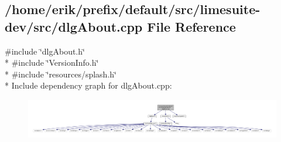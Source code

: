 \subsection{/home/erik/prefix/default/src/limesuite-\/dev/src/dlg\+About.cpp File Reference}
\label{dlgAbout_8cpp}
{\ttfamily \#include \char`\"{}dlg\+About.\+h\char`\"{}}\\*
{\ttfamily \#include \char`\"{}Version\+Info.\+h\char`\"{}}\\*
{\ttfamily \#include \char`\"{}resources/splash.\+h\char`\"{}}\\*
Include dependency graph for dlg\+About.\+cpp\+:
\nopagebreak
\begin{figure}[H]
\begin{center}
\leavevmode
\includegraphics[width=350pt]{d6/d4c/dlgAbout_8cpp__incl}
\end{center}
\end{figure}
